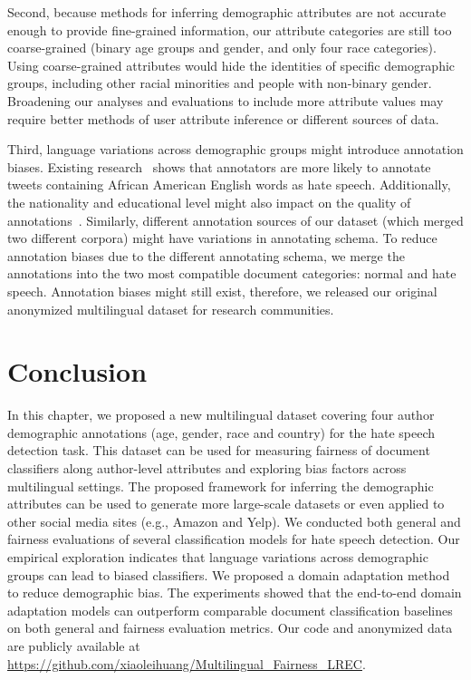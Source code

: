 Second, because methods for inferring demographic attributes are not accurate enough to provide fine-grained information, our attribute categories are still too coarse-grained (binary age groups and gender, and only four race categories).
Using coarse-grained attributes would hide the identities of specific demographic groups, including other racial minorities and people with non-binary gender.
Broadening our analyses and evaluations to include more attribute values may require better methods of user attribute inference or different sources of data.

Third, language variations across demographic groups might introduce annotation biases. Existing research~\cite{sap2019risk} shows that annotators are more likely to annotate tweets containing African American English words as hate speech.
Additionally, the nationality and educational level might also impact on the quality of annotations~\cite{founta2018large}.
Similarly, different annotation sources of our dataset (which merged two different corpora) might have variations in annotating schema.
To reduce annotation biases due to the different annotating schema,
we merge the annotations into the two most compatible document categories: normal and hate speech.
Annotation biases might still exist, therefore, 
we released our original anonymized multilingual dataset for research communities.


\section{Conclusion}

In this chapter, we proposed a new multilingual dataset covering four author demographic annotations (age, gender, race and country) for the hate speech detection task.
This dataset can be used for measuring fairness of document classifiers along author-level attributes and exploring bias factors across multilingual settings.
The proposed framework for inferring the demographic attributes can be used to generate more large-scale datasets or even applied to other social media sites (e.g., Amazon and Yelp).
We conducted both general and fairness evaluations of several classification models for hate speech detection. 
Our empirical exploration indicates that language variations across demographic groups can lead to biased classifiers.
We proposed a domain adaptation method to reduce demographic bias. 
The experiments showed that the end-to-end domain adaptation models can outperform comparable document classification baselines on both general and fairness evaluation metrics.
Our code and anonymized data are publicly available at \url{https://github.com/xiaoleihuang/Multilingual_Fairness_LREC}.
